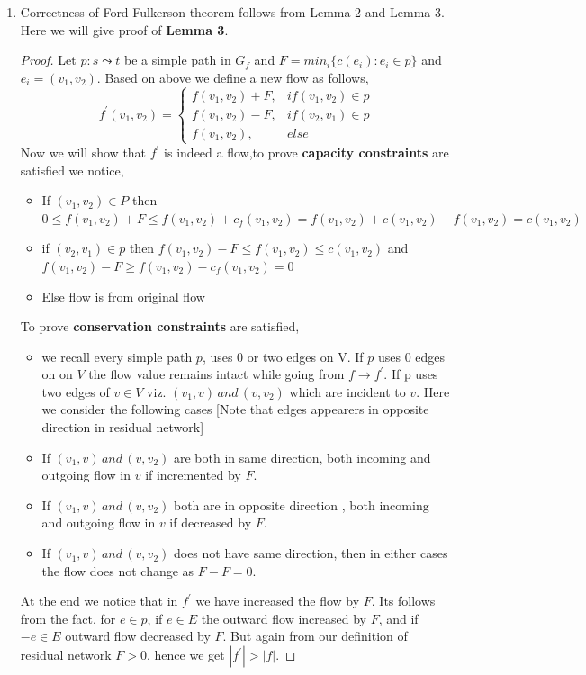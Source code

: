 \documentclass[12pt,a4paper,final]{article}
\theoremstyle{definition}
\begin{document}
\begin{enumerate}
\begin{enumerate}
\item
Correctness of Ford-Fulkerson theorem follows from Lemma 2 and Lemma 3. Here we will give proof of \textbf{Lemma 3}.
\begin{proof}
Let $p:s \leadsto t$ be a simple path in $G_f$ and $F = min_i \{c(e_i): e_i \in p\}$ and $e_i=(v_1,v_2)$. Based on above we define a new flow as follows,
\[
  f^\prime(v_1,v_2) =
  \begin{cases}
                      f(v_1,v_2) + F, & if (v_1,v_2) \in p \\
                      f(v_1,v_2) - F,  & if (v_2,v_1) \in p\\
                      f(v_1,v_2), & else
  \end{cases}
\]
Now we will show that $f^\prime$ is indeed a flow,to prove \textbf{capacity constraints} are satisfied we notice,
\begin{itemize}
\item
If $(v_1,v_2) \in P$ then $0 \leq f(v_1,v_2) + F \leq f(v_1,v_2) + c_f(v_1,v_2) = f(v_1,v_2) + c(v_1,v_2) - f(v_1,v_2)=c(v_1,v_2)$
\item
if $(v_2,v_1) \in p$ then $f(v_1,v_2) - F \leq f(v_1,v_2) \leq c(v_1,v_2)$ and $f(v_1,v_2) - F \geq f(v_1,v_2) - c_f(v_1,v_2) = 0$
\item
Else flow is from original flow
\end{itemize}
To prove \textbf{conservation constraints} are satisfied,


\begin{itemize}
\item
we recall every simple path $p$, uses 0 or two edges on V. If $p$ uses 0 edges on on $V$ the flow value remains intact while going from $f \to f^\prime$. If p uses two edges of $v \in V$ viz. $(v_1,v) \, and \, (v,v_2)$ which are incident to $v$. Here we consider the following cases [Note that edges appearers in opposite direction in residual network]
\item
If $(v_1,v) \, and \, (v,v_2)$ are both in same direction, both incoming and outgoing flow in $v$ if incremented by $F$.
\item
If $(v_1,v) \, and \, (v,v_2)$ both are in opposite direction , both incoming and outgoing flow in $v$ if decreased by $F$.
\item
If $(v_1,v) \, and \, (v,v_2)$ does not have same direction, then in either cases the flow does not change as $F-F=0$.

\end{itemize}
At the end we notice that in $f^\prime$ we have increased the flow by $F$. Its follows from the fact, for $e \in p$, if $e \in E$ the outward flow increased by $F$, and if $-e \in E$ outward flow decreased by $F$. But again from our definition of residual network $F>0$, hence we get $|f^\prime|>|f|$.
\end{proof}


\end{enumerate}
\end{enumerate}
\end{document}
